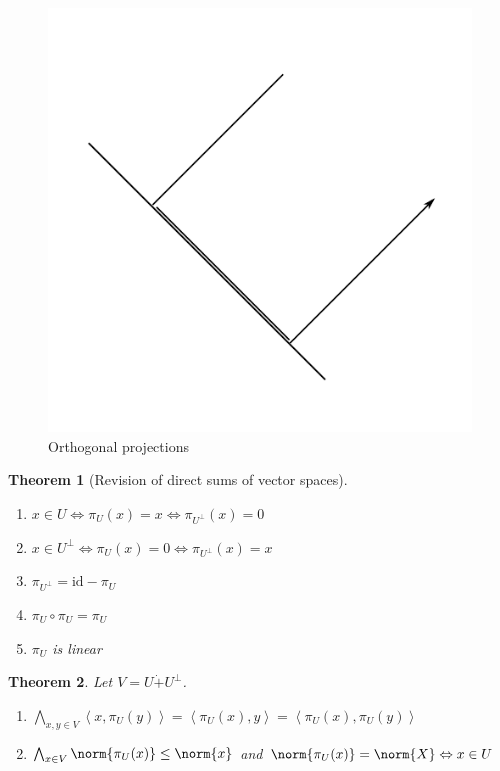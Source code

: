 \documentclass[a4paper,landscape,twocolumn]{article}
\newcommand\functional[1]{\left\langle{#1}\right\rangle}
\newtheorem{theorem}{Theorem}
\DeclarePairedDelimiter\norm\lVert\rVert
\begin{document}
\begin{figure}[!h]
  \begin{center}
    \includegraphics{img/orthogonal_projections.pdf}
    \caption{Orthogonal projections}
    \label{img:orth-proj}
  \end{center}
\end{figure}

\begin{theorem}[Revision of direct sums of vector spaces]
  \label{wh-8.49}
  \begin{enumerate}
    \item $x \in U \Leftrightarrow \pi_U(x) = x \Leftrightarrow \pi_{U^{\bot}}(x) = 0$
    \item $x \in U^{\bot} \Leftrightarrow \pi_U(x) = 0 \Leftrightarrow \pi_{U^{\bot}}(x) = x$
    \item $\pi_{U^{\bot}} = \text{id} - \pi_U$
    \item $\pi_U \circ \pi_U = \pi_U$
    \item $\pi_U$ is linear
  \end{enumerate}
\end{theorem}

\begin{theorem}
  \label{satz-8.50}
  Let $V = U \dot{+} U^{\bot}$.
  \begin{enumerate}
    \item $\bigwedge_{x,y \in V} \functional{x, \pi_U(y)} = \functional{\pi_U(x), y} = \functional{\pi_U(x), \pi_U(y)}$
    \item $\bigwedge_{x \in V} \norm{\pi_U(x)} \leq \norm{x}$
      and $\norm{\pi_U(x)} = \norm{X} \Leftrightarrow x \in U$
  \end{enumerate}
\end{theorem}
\end{document}
